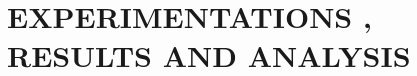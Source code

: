 \chapter{EXPERIMENTATIONS , RESULTS AND ANALYSIS}

\ifpdf
    \graphicspath{{Chapter4/Figs/Raster/}{Chapter4/Figs/PDF/}{Chapter4/Figs/}}
\else
    \graphicspath{{Chapter4/Figs/Vector/}{Chapter4/Figs/}}
\fi
